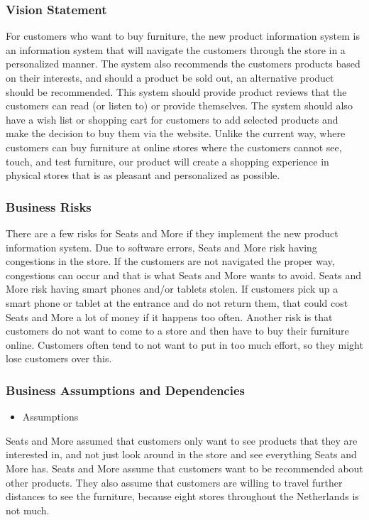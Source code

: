 \documentclass[a4paper]{article}
\begin{document}
\subsubsection*{Vision Statement}
For customers who want to buy furniture, the new product information system is an information system that will navigate the customers through the store in a personalized manner. The system also recommends the customers products based on their interests, and should a product be sold out, an alternative product should be recommended. This system should provide product reviews that the customers can read (or listen to) or provide themselves. The system should also have a wish list or shopping cart for customers to add selected products and make the decision to buy them via the website. Unlike the current way, where customers can buy furniture at online stores where the customers cannot see, touch, and test furniture, our product will create a shopping experience in physical stores that is as pleasant and personalized as possible.

\subsubsection*{Business Risks}
There are a few risks for Seats and More if they implement the new product information system. Due to software errors, Seats and More risk having congestions in the store. If the customers are not navigated the proper way, congestions can occur and that is what Seats and More wants to avoid. 
Seats and More risk having smart phones and/or tablets stolen. If customers pick up a smart phone or tablet at the entrance and do not return them, that could cost Seats and More a lot of money if it happens too often. 
Another risk is that customers do not want to come to a store and then have to buy their furniture online. 
Customers often tend to not want to put in too much effort, so they might lose customers over this.

\subsubsection*{Business Assumptions and Dependencies}
\begin{itemize}
\item Assumptions
\end{itemize}
Seats and More assumed that customers only want to see products that they are interested in, and not just look around in the store and see everything Seats and More has.
Seats and More assume that customers want to be recommended about other products.
They also assume that customers are willing to travel further distances to see the furniture, because eight stores throughout the Netherlands is not much.
\end{document}
